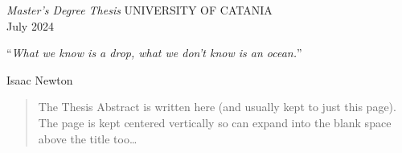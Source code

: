 \documentclass[
11pt, %
english, %
singlespacing, %
headsepline, %
]{MastersDoctoralThesis} %
\theoremstyle{plain}
\theoremstyle{definition}
\theoremstyle{remark}
\newcommand\alcentropagina[1]{\AddToShipoutPicture{%
		\AtPageCenter{\makebox(50,0){\texttt{[image: \#1]}}}}}
\begin{document}
\begin{titlepage}
	\begin{center}
		\alcentropagina{Figures/logos/logounict_v2.pdf}
		\vspace{21cm}
		\makeatletter
		\large\textrm{\authorname}
		\makeatother
		\vspace{8.85cm}
		\begin{center}
			\makeatletter
			\singlespacing\Huge\textsc{\ttitle}
			\makeatother
		\end{center}%
		\vspace{0.4cm}
		\makeatletter
		\large\textit{Master's Degree Thesis}
		\makeatother
		\vfill
		\large UNIVERSITY OF CATANIA\\
		\vspace{1cm}
		\makeatletter
		\large\textrm{July 2024} %
		\makeatother
	\end{center}
\end{titlepage}

\ClearShipoutPicture



\restoregeometry

\pagestyle{plain} %



\vspace*{0.2\textheight}

\noindent\enquote{\itshape What we know is a drop, what we don't know is an ocean.}\bigbreak

\hfill Isaac Newton


\begin{abstract}
The Thesis Abstract is written here (and usually kept to just this page). The page is kept centered vertically so can expand into the blank space above the title too\ldots
\end{abstract}
\end{document}
